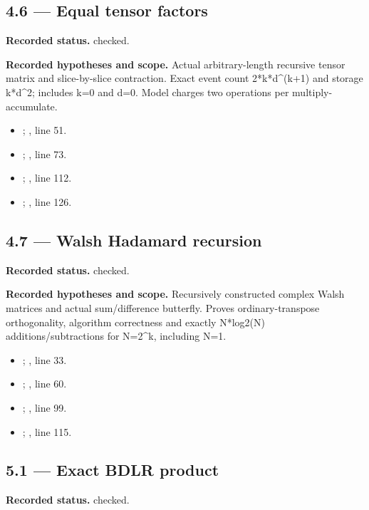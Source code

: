 \subsection{4.6 — Equal tensor factors}
\label{result:4.6}
\textbf{Recorded status.} checked.

\textbf{Recorded hypotheses and scope.} Actual arbitrary-length recursive tensor matrix and slice-by-slice contraction. Exact event count 2*k*d\textasciicircum{}(k+1) and storage k*d\textasciicircum{}2; includes k=0 and d=0. Model charges two operations per multiply-accumulate.

\begin{itemize}
\item {}; , line 51.
\item {}; , line 73.
\item {}; , line 112.
\item {}; , line 126.
\end{itemize}
\subsection{4.7 — Walsh Hadamard recursion}
\label{result:4.7}
\textbf{Recorded status.} checked.

\textbf{Recorded hypotheses and scope.} Recursively constructed complex Walsh matrices and actual sum/difference butterfly. Proves ordinary-transpose orthogonality, algorithm correctness and exactly N*log2(N) additions/subtractions for N=2\textasciicircum{}k, including N=1.

\begin{itemize}
\item {}; , line 33.
\item {}; , line 60.
\item {}; , line 99.
\item {}; , line 115.
\end{itemize}
\subsection{5.1 — Exact BDLR product}
\label{result:5.1}
\textbf{Recorded status.} checked.


